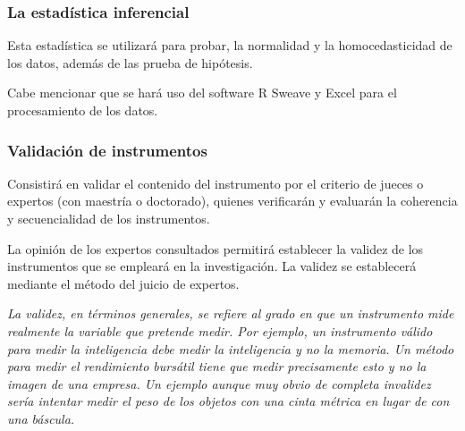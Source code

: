 \documentclass[12pt,a4paper]{article}
\begin{document}
\subsubsection{La estadística inferencial} Esta estadística se utilizará para probar, la normalidad y la homocedasticidad  de los datos, además de las prueba de hipótesis.

Cabe mencionar que se hará uso del software R Sweave y Excel para el procesamiento de los datos.

\subsubsection{Validación de instrumentos}
Consistirá en validar el contenido del instrumento por el criterio de jueces o expertos (con maestría o doctorado), quienes verificarán y evaluarán la coherencia y secuencialidad de los instrumentos.



La opinión de los expertos consultados permitirá establecer la validez de los instrumentos que se empleará en la investigación. La validez se establecerá mediante el método del juicio de expertos.



\begin{adjustwidth}{1cm}{}
	\emph{La validez, en términos generales, se refiere al grado en que un instrumento mide
		realmente la variable que pretende medir. Por ejemplo, un instrumento válido para medir la inteligencia debe medir la inteligencia y no la memoria. Un método para medir
		el rendimiento bursátil tiene que medir precisamente esto y no la imagen de una empresa. Un ejemplo aunque muy obvio de completa invalidez sería intentar medir el peso de los objetos con una cinta métrica en lugar de con una báscula.} \cite[p.~200]{alzina_metodologiinvestigacion_2004}
\end{adjustwidth}

\end{document}
